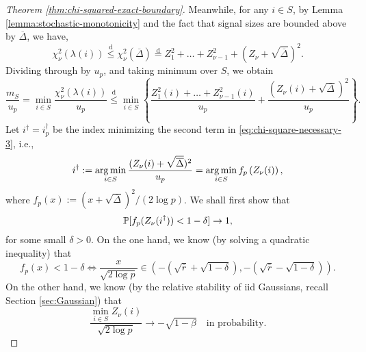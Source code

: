 \begin{proof}[Theorem \ref{thm:chi-squared-exact-boundary}]
Meanwhile, for any $i\in S$, by Lemma \ref{lemma:stochastic-monotonicity} and the fact that signal sizes are bounded above by $\overline{\Delta}$, we have,
\begin{equation*}
    {\chi_\nu^2(\lambda(i))} \stackrel{\mathrm{d}}{\le}
    {\chi_\nu^2(\overline{\Delta})} \stackrel{\mathrm{d}}{=} 
    {Z_1^2 + \ldots + Z_{\nu-1}^2 + \left(Z_\nu + \sqrt{\overline{\Delta}}\right)^2}.
\end{equation*}
Dividing through by $u_p$, and taking minimum over $S$, we obtain
\begin{equation} \label{eq:chi-square-necessary-3}
    \frac{m_S}{u_p} 
    = \min_{i\in S} \frac{\chi_\nu^2(\lambda(i))}{u_p} 
    \stackrel{\mathrm{d}}{\le} 
    \min_{i\in S}\left\{\frac{Z_1^2(i) + \ldots + Z_{\nu-1}^2(i)}{u_p} + \frac{(Z_\nu(i) + \sqrt{\overline{\Delta}})^2}{u_p}\right\}.
\end{equation}
Let $i^\dagger = i^\dagger_p$ be the index minimizing the second term in \eqref{eq:chi-square-necessary-3}, i.e.,
\begin{equation}
    i^\dagger := \argmin_{i\in S} \frac{(Z_\nu(i) + \sqrt{\overline{\Delta}})^2}{u_p}
    = \argmin_{i\in S} f_p\left(Z_\nu(i)\right),
\end{equation}
where $f_p(x):=(x+\sqrt{\overline{\Delta}})^2/(2\log{p})$. 
We shall first show that 
\begin{equation} \label{eq:chi-square-necessary-4}
    \P[ f_p(Z_\nu(i^\dagger)) < 1 -\delta ] \to 1,
\end{equation}
for some small $\delta>0$.
On the one hand, we know (by solving a quadratic inequality) that
\begin{equation} \label{eq:chi-square-necessary-5}
    f_p(x)<1-\delta \iff \frac{x}{\sqrt{2\log{p}}} \in (-(\sqrt{\overline{r}}+\sqrt{1-\delta}), -(\sqrt{\overline{r}}-\sqrt{1-\delta})).
\end{equation}
On the other hand, we know (by the relative stability of iid Gaussians, recall Section \ref{sec:Gaussian}) that 
\begin{equation} \label{eq:chi-square-necessary-6}
    \frac{\min_{i\in S} Z_\nu(i)}{\sqrt{2\log{p}}}
    \to -\sqrt{1-\beta} \quad\text{in probability}.
\end{equation}

\end{proof}
